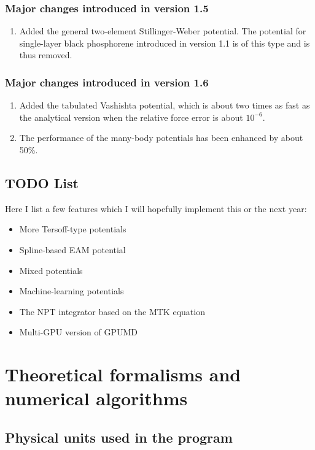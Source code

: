 \documentclass[12pt,a4paper]{report}
\begin{document}
\subsection{Major changes introduced in version 1.5}
\begin{enumerate}
\item Added the general two-element Stillinger-Weber potential. The potential for single-layer black phosphorene introduced in version 1.1 is of this type and is thus removed.
\end{enumerate}

\subsection{Major changes introduced in version 1.6}
\begin{enumerate}
\item Added the tabulated Vashishta potential, which is about two times as fast as the analytical version when the relative force error is about $10^{-6}$.
\item The performance of the many-body potentials has been enhanced by about 50\%.
\end{enumerate}




\section{TODO List}

Here I list a few features which I will hopefully implement this or the next year:
\begin{itemize}
\item More Tersoff-type potentials
\item Spline-based EAM potential
\item Mixed potentials
\item Machine-learning potentials
\item The NPT integrator based on the MTK equation
\item Multi-GPU version of GPUMD
\end{itemize}


\chapter{Theoretical formalisms and numerical algorithms}

\section{Physical units used in the program}
\end{document}
